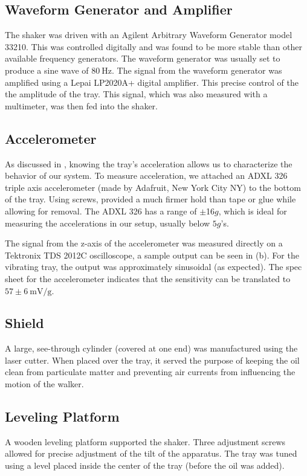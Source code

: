 \subsection{Waveform Generator and Amplifier}
    The shaker was driven with an Agilent Arbitrary Waveform Generator model 33210. This was controlled digitally and was found to be more stable than other available frequency generators. The waveform generator was usually set to produce a sine wave of $80~\mathrm{Hz}$. The signal from the waveform generator was amplified using a Lepai LP2020A+ digital amplifier. This precise control of the the amplitude of the tray. This signal, which was also measured with a multimeter, was then fed into the shaker.    
            
\subsection{Accelerometer}  
    As discussed in , knowing the tray's acceleration allows us to characterize the behavior of our system. To measure acceleration, we attached an ADXL 326 triple axis accelerometer (made by Adafruit, New York City NY) to the bottom of the tray. Using screws, provided a much firmer hold than tape or glue while allowing for removal. The ADXL 326 has a range of $\pm$16$g$, which is ideal for measuring the accelerations in our setup, usually below $5g$'s. 
      
      The signal from the z-axis of the accelerometer was measured directly on a Tektronix TDS 2012C oscilloscope, a sample output can be seen in (b). For the vibrating tray, the output was approximately sinusoidal (as expected). The spec sheet for the accelerometer indicates that the sensitivity can be translated to $57 \pm 6~\mathrm{mV/g}$. 
    
\subsection{Shield}
    A large, see-through cylinder (covered at one end) was manufactured using the laser cutter. When placed over the tray, it served the purpose of keeping the oil clean from particulate matter and preventing air currents from influencing the motion of the walker.       
   
\subsection{Leveling Platform}
    A wooden leveling platform supported the shaker. Three adjustment screws allowed for precise adjustment of the tilt of the apparatus. The tray was tuned using a level placed inside the center of the tray (before the oil was added). 

